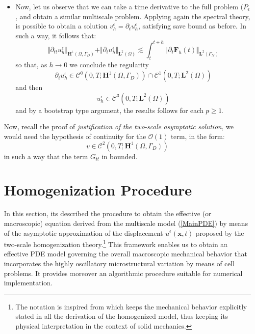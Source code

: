 \begin{itemize}
    
    \item Now, let us observe that we can take a time derivative to the full problem $(P_{\epsilon}$, and obtain a similar multiscale problem. Applying again the spectral theory, is possible to obtain a solution $v_h^{\epsilon} = \partial_t u_h^{\epsilon}$, satisfying save bound as before. In such a way, it follows that:
    \begin{equation*}
        \Vert \partial_{tt} u_h^{\epsilon} \Vert_{\mathbf{H}^1(\Omega, \Gamma_D)} + \Vert \partial_t u_h^{\epsilon} \Vert_{\mathbf{L}^2 (\Omega)} \lesssim \int_t^{t+h} \Vert \partial_t \mathbf{F}_h(t) \Vert_{\mathbf{L}^2(\Gamma_N)}
    \end{equation*}
    so that, as $h \rightarrow 0$ we conclude the regularity
    \begin{equation*}
        \partial_t u_h^{\epsilon} \in \mathcal{C}^0(0,T;\mathbf{H}^1(\Omega, \Gamma_D)) \cap \mathcal{C}^1(0,T;\mathbf{L}^2(\Omega)) 
    \end{equation*}
    and then
    \begin{equation*}
        u_h^{\epsilon} \in \mathcal{C}^3(0,T; \mathbf{L}^2(\Omega))
    \end{equation*}
    and by a bootstrap type argument, the results follows for each $p \geq 1$.
\end{itemize}
\begin{rem}
Now, recall the proof of \textit{justification of the two-scale asymptotic solution}, we would need the hypothesis of continuity for the $\mathcal{O}(1)$ term, in the form:
\begin{equation*}
    v \in \mathcal{C}^2(0,T; \mathbf{H}^1(\Omega, \Gamma_D))
\end{equation*}
in such a way that the term $G_{tt}$ in bounded.
\end{rem}



\section{Homogenization Procedure}

 In this section, its described the procedure to obtain the effective (or macroscopic) equation derived from the multiscale model (\ref{MainPDE}) by means of the asymptotic approximation of the displacement $u^{\epsilon}(\mathbf{x},t)$ proposed by the two-scale homogenization theory.\footnote{The notation is inspired from \cite{altenbach2018generalized} which keeps the mechanical behavior explicitly stated in all the derivation of the homogenized model, thus keeping its physical interpretation in the context of solid mechanics.} This framework enables us to obtain an effective PDE model governing the overall macroscopic mechanical behavior that incorporates the highly oscillatory microstructural variation by means of cell problems. It provides moreover an algorithmic procedure suitable for numerical implementation.

